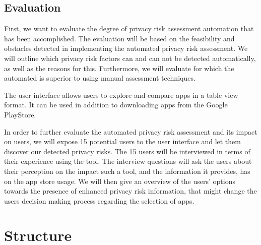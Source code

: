 \documentclass[
	a4paper,
	oneside,
	12pt,
	liststotocnumbered
]{article}
\let\cite\textcite
\begin{document}
\subsection{Evaluation}

First, we want to evaluate the degree of privacy risk assessment automation that has been accomplished. 
The evaluation will be based on the feasibility and obstacles detected in implementing the automated privacy risk assessment. 
We will outline which privacy risk factors can and can not be detected automatically, as well as the reasons for this.
Furthermore, we will evaluate for which \prfs the automated \sca is superior to using manual assessment techniques.

The \cite{Bruggemann2016} user interface allows users to explore and compare \mH apps in a table view format. 
It can be used in addition to downloading apps from the Google PlayStore.

In order to further evaluate the automated privacy risk assessment and its impact on users, we will expose 15 potential users to the user interface and let them discover our detected privacy risks.
The 15 users will be interviewed in terms of their experience using the \pra tool. 
The interview questions will ask the users about their perception on the impact such a tool, and the information it provides, has on the app store usage.
We will then give an overview of the users' options towards the presence of enhanced privacy risk information, that might change the users decision making process regarding the selection of \mH apps.

\section{Structure}
\end{document}
